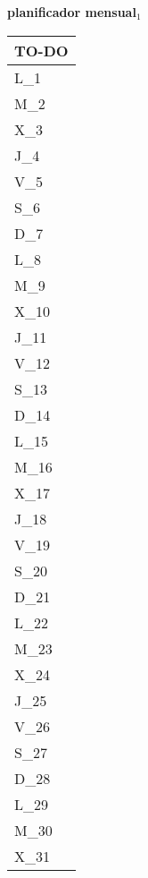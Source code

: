 \clearpage
{\raggedright
	\fontsize{25}{50}\selectfont
	\textbf{\NextYear}
}\scriptsize{\textbf{planificador mensual$_1$}}\\[11.3pt]



	\noindent\dotfill
	\renewcommand{\arraystretch}{1.5}\scriptsize
		\begin{longtabu} to \textwidth { X[l]}
		\centering \small{\textbf{TO-DO}} \\
		\toprule
		L_{1} \dotfill\\
		M_{2} \dotfill\\
		X_{3} \dotfill\\
		J_{4} \dotfill\\
		V_{5} \dotfill\\
		S_{6} \dotfill\\
		D_{7} \dotfill\\
		\hline
		L_{8} \dotfill\\
		M_{9} \dotfill\\
		X_{10} \dotfill\\
		J_{11} \dotfill\\
		V_{12} \dotfill\\
		S_{13} \dotfill\\
		D_{14} \dotfill\\
		\hline
		L_{15} \dotfill\\
		M_{16} \dotfill\\
		X_{17} \dotfill\\
		J_{18} \dotfill\\
		V_{19} \dotfill\\
		S_{20} \dotfill\\
		D_{21} \dotfill\\
		\hline
		L_{22} \dotfill\\
		M_{23} \dotfill\\
		X_{24} \dotfill\\
		J_{25} \dotfill\\
		V_{26} \dotfill\\
		S_{27} \dotfill\\
		D_{28} \dotfill\\
		\hline
		L_{29} \dotfill\\
		M_{30} \dotfill\\
		X_{31} \dotfill\\

		\bottomrule

	\end{longtabu}


\clearpage
